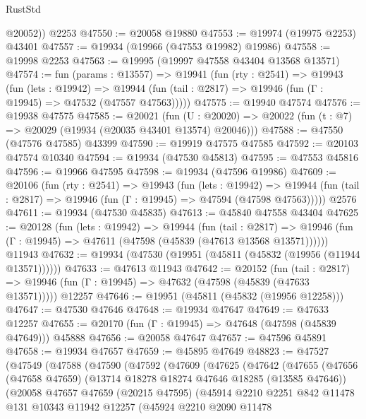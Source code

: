 \begin{lexlean}{RustStd}
\begin{coremodule}
        @20052))
    @2253
@47550 := @20058 @19880
@47553 := @19974 (@19975 @2253) @43401
@47557 := @19934 (@19966 (@47553 @19982) @19986)
@47558 := @19998 @2253
@47563 := @19995 (@19997 @47558 @43404 @13568 @13571)
@47574 := fun (params : @13557) =>
  @19941
    (fun (rty : @2541) =>
    @19943
      (fun (lets : @19942) =>
      @19944 (fun (tail : @2817) => @19946 (fun (Γ : @19945) => @47532 (@47557 @47563)))))
@47575 := @19940 @47574
@47576 := @19938 @47575
@47585 := @20021
    (fun (U : @20020) => @20022 (fun (t : @7) => @20029 (@19934 (@20035 @43401 @13574) @20046)))
@47588 := @47550 (@47576 @47585) @43399
@47590 := @19919 @47575 @47585
@47592 := @20103 @47574 @10340
@47594 := @19934 (@47530 @45813)
@47595 := @47553 @45816
@47596 := @19966 @47595
@47598 := @19934 (@47596 @19986)
@47609 := @20106
    (fun (rty : @2541) =>
    @19943
      (fun (lets : @19942) =>
      @19944 (fun (tail : @2817) => @19946 (fun (Γ : @19945) => @47594 (@47598 @47563)))))
    @2576
@47611 := @19934 (@47530 @45835)
@47613 := @45840 @47558 @43404
@47625 := @20128
    (fun (lets : @19942) =>
    @19944
      (fun (tail : @2817) =>
      @19946 (fun (Γ : @19945) => @47611 (@47598 (@45839 (@47613 @13568 @13571))))))
    @11943
@47632 := @19934 (@47530 (@19951 (@45811 (@45832 (@19956 (@11944 @13571))))))
@47633 := @47613 @11943
@47642 := @20152
    (fun (tail : @2817) => @19946 (fun (Γ : @19945) => @47632 (@47598 (@45839 (@47633 @13571)))))
    @12257
@47646 := @19951 (@45811 (@45832 (@19956 @12258)))
@47647 := @47530 @47646
@47648 := @19934 @47647
@47649 := @47633 @12257
@47655 := @20170 (fun (Γ : @19945) => @47648 (@47598 (@45839 @47649))) @45888
@47656 := @20058 @47647
@47657 := @47596 @45891
@47658 := @19934 @47657
@47659 := @45895 @47649
@48823 := @47527
    (@47549
      (@47588
        (@47590
          (@47592
            (@47609
              (@47625
                (@47642
                  (@47655
                    (@47656
                      (@47658 @47659)
                      (@13714 @18278 @18274 @47646 @18285 (@13585 @47646))
                      (@20058
                        @47657
                        @47659
                        (@20215 @47595)
                        (@45914
                          @2210
                          @2251
                          @842
                          @11478
                          @131
                          @10343
                          @11942
                          @12257
                          (@45924
                            @2210
                            @2090
                            @11478

\end{coremodule}
\end{lexlean}
